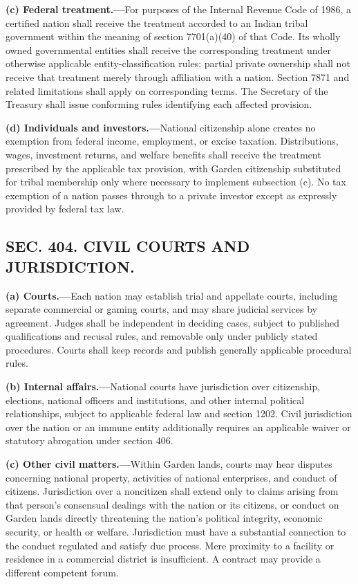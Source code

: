 \documentclass[12pt,letterpaper]{article}
\begin{document}
\textbf{(c) Federal treatment.---}For purposes of the Internal Revenue Code of 1986, a certified nation shall receive the treatment accorded to an Indian tribal government within the meaning of section 7701(a)(40) of that Code. Its wholly owned governmental entities shall receive the corresponding treatment under otherwise applicable entity-classification rules; partial private ownership shall not receive that treatment merely through affiliation with a nation. Section 7871 and related limitations shall apply on corresponding terms. The Secretary of the Treasury shall issue conforming rules identifying each affected provision.

\textbf{(d) Individuals and investors.---}National citizenship alone creates no exemption from federal income, employment, or excise taxation. Distributions, wages, investment returns, and welfare benefits shall receive the treatment prescribed by the applicable tax provision, with Garden citizenship substituted for tribal membership only where necessary to implement subsection (c). No tax exemption of a nation passes through to a private investor except as expressly provided by federal tax law.

\subsection*{SEC. 404. CIVIL COURTS AND JURISDICTION.}

\textbf{(a) Courts.---}Each nation may establish trial and appellate courts, including separate commercial or gaming courts, and may share judicial services by agreement. Judges shall be independent in deciding cases, subject to published qualifications and recusal rules, and removable only under publicly stated procedures. Courts shall keep records and publish generally applicable procedural rules.

\textbf{(b) Internal affairs.---}National courts have jurisdiction over citizenship, elections, national officers and institutions, and other internal political relationships, subject to applicable federal law and section 1202. Civil jurisdiction over the nation or an immune entity additionally requires an applicable waiver or statutory abrogation under section 406.

\textbf{(c) Other civil matters.---}Within Garden lands, courts may hear disputes concerning national property, activities of national enterprises, and conduct of citizens. Jurisdiction over a noncitizen shall extend only to claims arising from that person's consensual dealings with the nation or its citizens, or conduct on Garden lands directly threatening the nation's political integrity, economic security, or health or welfare. Jurisdiction must have a substantial connection to the conduct regulated and satisfy due process. Mere proximity to a facility or residence in a commercial district is insufficient. A contract may provide a different competent forum.
\end{document}
